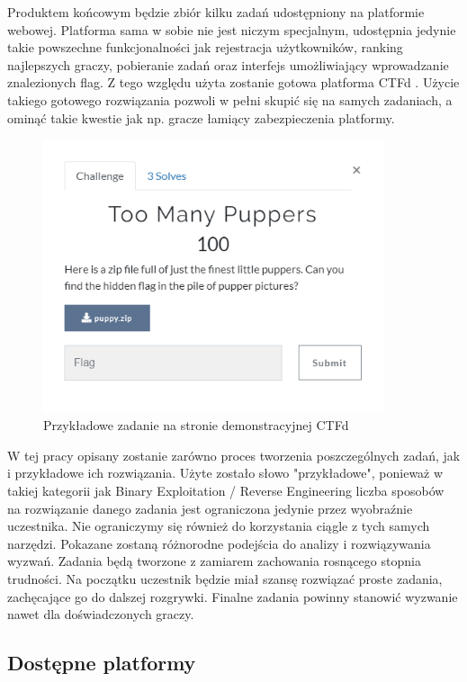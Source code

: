 \documentclass[polish,12pt]{aghthesis}
\begin{document}
Produktem końcowym będzie zbiór kilku zadań udostępniony na platformie webowej.
Platforma sama w sobie nie jest niczym specjalnym, udostępnia jedynie takie powszechne
funkcjonalności jak rejestracja użytkowników, ranking najlepszych graczy,
pobieranie zadań oraz interfejs umożliwiający wprowadzanie znalezionych
flag. Z tego względu użyta zostanie gotowa platforma CTFd \cite{CTFd}.
Użycie takiego gotowego rozwiązania pozwoli w pełni skupić się na samych zadaniach,
a ominąć takie kwestie jak np. gracze łamiący zabezpieczenia platformy.

\begin{figure}[ht]
    \centering
    \includegraphics[width=10cm]{ctfd}
    \caption{Przykładowe zadanie na stronie demonstracyjnej CTFd}
    \label{fig:ctfd}
\end{figure}

W tej pracy opisany zostanie zarówno proces tworzenia poszczególnych zadań,
jak i przykładowe ich rozwiązania. Użyte zostało słowo "przykładowe", ponieważ
w takiej kategorii jak Binary Exploitation / Reverse Engineering liczba sposobów
na rozwiązanie danego zadania jest ograniczona jedynie przez wyobraźnie uczestnika.
Nie ograniczymy się również do korzystania ciągle z tych samych narzędzi.
Pokazane zostaną różnorodne podejścia do analizy i rozwiązywania wyzwań.
Zadania będą tworzone z zamiarem zachowania rosnącego stopnia trudności.
Na początku uczestnik będzie miał szansę rozwiązać proste zadania,
zachęcające go do dalszej rozgrywki. Finalne zadania powinny stanowić wyzwanie
nawet dla doświadczonych graczy. \pagebreak

\subsection{Dostępne platformy}
\end{document}
